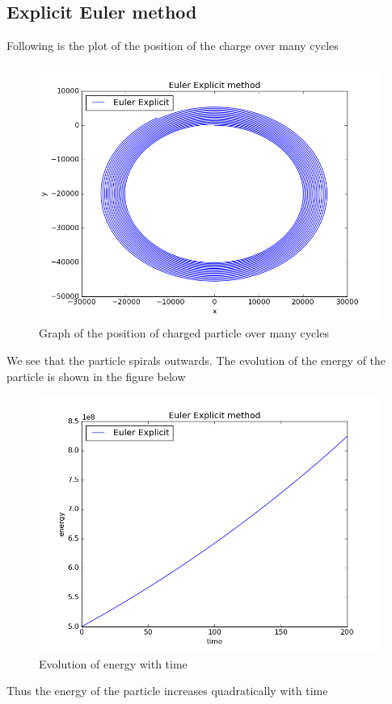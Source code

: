\documentclass[11pt, a4paper]{article}
\begin{document}
\subsection{Explicit Euler method}
Following is the plot of the position of the charge over many cycles
\begin{figure}[H]
 \centering
 \includegraphics[scale = 0.5]{Euler_exp_1.png}
 \caption{Graph of the position of charged particle over many cycles}
\end{figure}
We see that the particle spirals outwards.
\newpage
The evolution of the energy of the particle is shown in the figure below
\begin{figure}[H]
 \centering
 \includegraphics[scale = 0.5]{Euler_exp_en_1.png}
 \caption{Evolution of energy with time}
\end{figure}
Thus the energy of the particle increases quadratically with time
\end{document}

